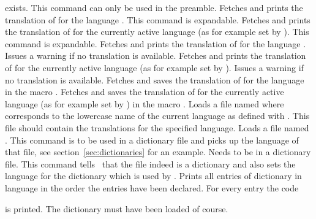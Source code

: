 \documentclass[DIV11,toc=index,toc=bib,numbers=noendperiod]{cnpkgdoc}
\newcommand*\unexpsign{$\RHD$}
\newcommand*\expsign{\textcolor{red}{$\rhd$}}
\renewcommand*\cnpkgdoctriangle{\unexpsign}
\newcommand*\expandable{%
  \def\cnpkgdoctriangle{%
    \expsign
    \gdef\cnpkgdoctriangle{\unexpsign}}}
\begin{document}
\begin{beschreibung}
   exists.  This command can only be used in the preamble.
 \expandable{}\newline
   Fetches and prints the translation of  for the language
   .  This command is expandable.
 \expandable{}\newline
   Fetches and prints the translation of  for the currently active
   language (as for example set by ).  This command is expandable.
 \newline
   Fetches and prints the translation of  for
   the language .  Issues a warning if no translation is
   available.
 \newline
   Fetches and prints the translation of  for
   the currently active language (as for example set by ).
   Issues a warning if no translation is available.
 \newline
   Fetches and saves the translation of  for the language
    in the macro .
 \newline
   Fetches and saves the translation of  for the currently active
   language (as for example set by ) in the macro .
 \newline
   Loads a file named  where  corresponds
   to the lowercase name of the current language as defined with
   . This file should contain the translations for the
   specified language.
 \newline
   Loads a file named .
 \newline
   This command is to be used in a dictionary file and picks up the language
   of that file, see section~\ref{sec:dictionaries} for an example.
 \newline
   Needs to be in a dictionary file.  This command tells \translations\ that
   the file indeed is a dictionary and also sets the language for the
   dictionary which is used by .
 \newline
   Prints all entries of dictionary  in
   language  in the order the entries have been declared.  For
   every entry the code\par
   \par
   is printed.  The dictionary must have been loaded of course.
\end{beschreibung}
\end{document}
